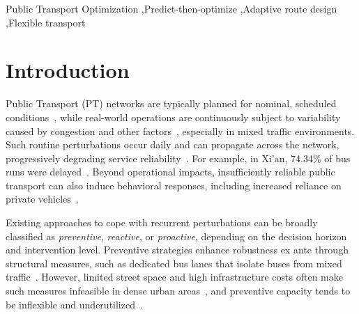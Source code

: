 \documentclass[a4paper,fleqn]{cas-sc}
\begin{document}
\begin{highlights}
\item 
\item 
\item 
\end{highlights}


\begin{keywords}
Public Transport Optimization \sep Predict-then-optimize \sep Adaptive route design \sep Flexible transport
\end{keywords}

\maketitle

\section{Introduction}

Public Transport (PT) networks are typically planned for nominal, scheduled conditions~\citep{ibarra2015planning}, while real-world operations are continuously subject to variability caused by congestion and other factors~\citep{buchel2020review, danaher2020minutes}, especially in mixed traffic environments. Such routine perturbations occur daily and can propagate across the network, progressively degrading service reliability~\citep{marra2020delay}. For example, in Xi’an, 74.34\% of bus runs were delayed~\citep{zhang2022travel}. 
Beyond operational impacts, insufficiently reliable public transport can also induce behavioral responses, including increased reliance on private vehicles~\citep{rodier2025evaluation}.

Existing approaches to cope with recurrent perturbations can be broadly classified as \emph{preventive}, \emph{reactive}, or \emph{proactive}, depending on the decision horizon and intervention level. 
Preventive strategies enhance robustness ex ante through structural measures, such as dedicated bus lanes that isolate buses from mixed traffic~\citep{russo2022dedicated}. 
However, limited street space and high infrastructure costs often make such measures infeasible in dense urban areas~\citep{li2009evaluation}, and preventive capacity tends to be inflexible and underutilized~\citep{ITF2024, ITF2025}.
\end{document}

